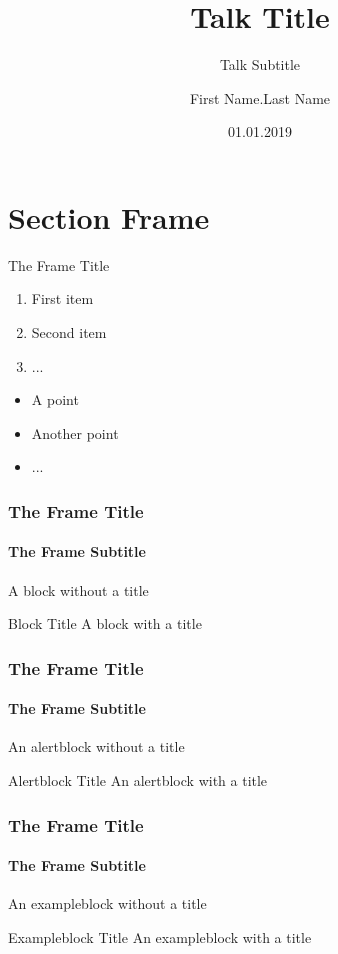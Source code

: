 \documentclass[14pt]{beamer}
\title[Small Title]{Talk Title}
\subtitle{Talk Subtitle}
\author{First Name.Last Name}
\date{01.01.2019}
\begin{document}
\begin{frame}[plain]
  \maketitle
\end{frame}

\section{Section Frame}
\frame{\sectionpage}

\begin{frame}{The Frame Title}

  \begin{enumerate}
    \item First item
    \item Second item
    \item ...
  \end{enumerate}

  \vfill

  \begin{itemize}
    \item A point
    \item Another point
    \item ...
  \end{itemize}
  
\end{frame}

\begin{frame}
  \frametitle{The Frame Title}
  \framesubtitle{The Frame Subtitle}

  \begin{block}{}
    A block without a title
  \end{block}

  \vfill

  \begin{block}{Block Title}
    A block with a title
  \end{block}

\end{frame}

\begin{frame}
  \frametitle{The Frame Title}
  \framesubtitle{The Frame Subtitle}
  
  \begin{alertblock}{}
    An alertblock without a title
  \end{alertblock}

  \vfill

  \begin{alertblock}{Alertblock Title}
    An alertblock with a title
  \end{alertblock}

\end{frame}

\begin{frame}
  \frametitle{The Frame Title}
  \framesubtitle{The Frame Subtitle}

  \begin{exampleblock}{}
    An exampleblock without a title
  \end{exampleblock}

  \vfill

  \begin{exampleblock}{Exampleblock Title}
    An exampleblock with a title
  \end{exampleblock}

\end{frame}
\end{document}
